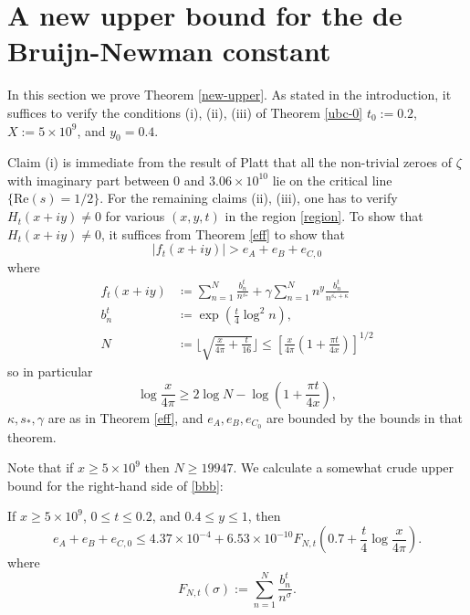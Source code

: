 \section{A new upper bound for the de Bruijn-Newman constant}

In this section we prove Theorem \ref{new-upper}.  As stated in the introduction, it suffices to verify the conditions (i), (ii), (iii) of Theorem \ref{ubc-0} $t_0 := 0.2$, $X := 5 \times 10^9$, and $y_0 = 0.4$.  

Claim (i) is immediate from the result of Platt \cite{platt} that all the non-trivial zeroes of $\zeta$ with imaginary part between $0$ and $3.06 \times 10^{10}$ lie on the critical line $\{ \mathrm{Re}(s) = 1/2\}$.  For the remaining claims (ii), (iii), one has to verify $H_t(x+iy) \neq 0$ for various $(x,y,t)$ in the region \eqref{region}.
To show that $H_t(x+iy) \neq 0$, it suffices from Theorem \ref{eff} to show that
\begin{equation}\label{bbb}
|f_t(x+iy)| > e_A + e_B + e_{C,0} 
\end{equation}
where
\begin{align*}
f_t(x+iy) &\coloneqq \sum_{n=1}^N \frac{b_n^t}{n^{s_*}} + \gamma \sum_{n=1}^N n^y \frac{b_n^t}{n^{\overline{s_*} + \kappa}}\\
b_n^t &\coloneqq \exp( \frac{t}{4} \log^2 n),\\
N &\coloneqq \lfloor \sqrt{\frac{x}{4\pi} + \frac{t}{16}} \rfloor \leq [\frac{x}{4\pi} (1 + \frac{\pi t}{4x})]^{1/2}
\end{align*}
so in particular
\begin{equation}\label{logx}
 \log \frac{x}{4\pi} \geq 2 \log N - \log(1 + \frac{\pi t}{4x}),
\end{equation}
$\kappa, s_*, \gamma$ are as in Theorem \ref{eff}, and $e_A, e_B, e_{C_0}$ are bounded by the bounds in that theorem.

Note that if $x \geq 5 \times 10^9$ then $N \geq 19947$.  We calculate a somewhat crude upper bound for the right-hand side of \eqref{bbb}:

\begin{lemma}\label{lac}  If $x \geq 5 \times 10^9$, $0 \leq t \leq 0.2$, and $0.4 \leq y \leq 1$, then
$$ e_A + e_B + e_{C,0} \leq 4.37 \times 10^{-4} + 6.53 \times 10^{-10} F_{N,t}(0.7 + \frac{t}{4} \log \frac{x}{4\pi}).$$
where
\begin{equation}\label{fnt-def}
 F_{N,t}( \sigma ) := \sum_{n=1}^N \frac{b_n^t}{n^\sigma}.
\end{equation}
\end{lemma}

